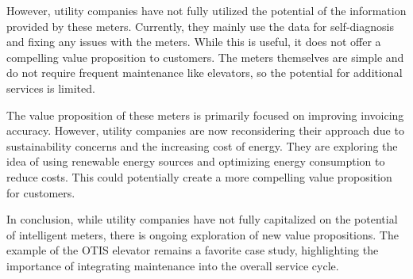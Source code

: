 
However, utility companies have not fully utilized the potential of the
information provided by these meters. Currently, they mainly use the
data for self-diagnosis and fixing any issues with the meters. While
this is useful, it does not offer a compelling value proposition to
customers. The meters themselves are simple and do not require frequent
maintenance like elevators, so the potential for additional services is
limited.

The value proposition of these meters is primarily focused on improving
invoicing accuracy. However, utility companies are now reconsidering
their approach due to sustainability concerns and the increasing cost of
energy. They are exploring the idea of using renewable energy sources
and optimizing energy consumption to reduce costs. This could
potentially create a more compelling value proposition for customers.

In conclusion, while utility companies have not fully capitalized on the
potential of intelligent meters, there is ongoing exploration of new
value propositions. The example of the OTIS elevator remains a
favorite case study, highlighting the importance of integrating
maintenance into the overall service cycle.

